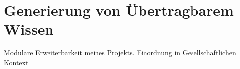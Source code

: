 \chapter{Generierung von Übertragbarem Wissen}\label{ch:experiments}

Modulare Erweiterbarkeit meines Projekts.
Einordnung in Gesellschaftlichen Kontext
